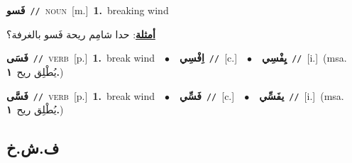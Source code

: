 \documentclass[10pt,a4paper,twoside]{article} %
\begin{document}
\begin{multicols}{2}
{\setlength\topsep{0pt}\textbf{\foreignlanguage{arabic}{فَسو}}\ {\color{gray}\texttt{//}\color{black}}\ \textsc{noun}\ [m.]\ \textbf{1.}~breaking wind\  \begin{flushright}\color{gray}\foreignlanguage{arabic}{\textbf{\underline{\foreignlanguage{arabic}{أمثلة}}}: حدا شامِم ريحة فَسو بالغرفة؟}\end{flushright}\color{black}} \vspace{2mm}

{\setlength\topsep{0pt}\textbf{\foreignlanguage{arabic}{فَسَى}}\ {\color{gray}\texttt{//}\color{black}}\ \textsc{verb}\ [p.]\ \textbf{1.}~break wind\ \ $\bullet$\ \ \setlength\topsep{0pt}\textbf{\foreignlanguage{arabic}{اِفْسِي}}\ {\color{gray}\texttt{//}\color{black}}\ [c.]\ \ $\bullet$\ \ \setlength\topsep{0pt}\textbf{\foreignlanguage{arabic}{يِفْسِي}}\ {\color{gray}\texttt{//}\color{black}}\ [i.]\ \color{gray}(msa. \foreignlanguage{arabic}{يُطْلِق ريح}~\foreignlanguage{arabic}{\textbf{١.}})\color{black}\ } \vspace{2mm}

{\setlength\topsep{0pt}\textbf{\foreignlanguage{arabic}{فَسَّى}}\ {\color{gray}\texttt{//}\color{black}}\ \textsc{verb}\ [p.]\ \textbf{1.}~break wind\ \ $\bullet$\ \ \setlength\topsep{0pt}\textbf{\foreignlanguage{arabic}{فَسِّي}}\ {\color{gray}\texttt{//}\color{black}}\ [c.]\ \ $\bullet$\ \ \setlength\topsep{0pt}\textbf{\foreignlanguage{arabic}{يفَسِّي}}\ {\color{gray}\texttt{//}\color{black}}\ [i.]\ \color{gray}(msa. \foreignlanguage{arabic}{يُطْلِق ريح}~\foreignlanguage{arabic}{\textbf{١.}})\color{black}\ } \vspace{2mm}

\vspace{-3mm}
\subsection*{\color{blue}\foreignlanguage{arabic}{ف.ش.خ}\color{blue}{}} 


\end{multicols}
\end{document}
